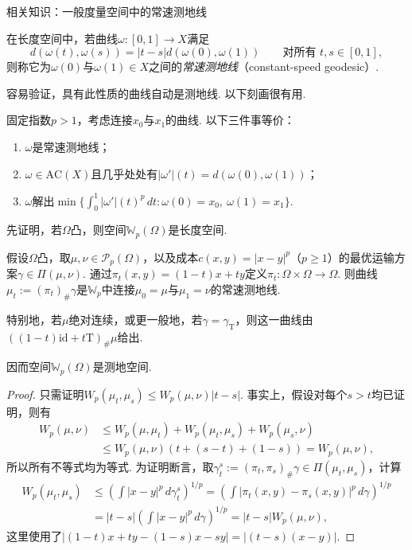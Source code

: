 \begin{sourcebox}{相关知识：一般度量空间中的常速测地线}
\begin{definition*}
在长度空间中，若曲线$\omega:[0,1]\to X$满足
\[
d(\omega(t),\omega(s))=|t-s|d(\omega(0),\omega(1))\qquad\text{对所有 }t,s\in[0,1],
\]
则称它为$\omega(0)$与$\omega(1)\in X$之间的\emph{常速测地线}（constant-speed geodesic）.
\end{definition*}
容易验证，具有此性质的曲线自动是测地线. 以下刻画很有用.
\begin{proposition*}
固定指数$p>1$，考虑连接$x_0$与$x_1$的曲线. 以下三件事等价：
\begin{enumerate}
\item $\omega$是常速测地线；
\item $\omega\in\mathrm{AC}(X)$且几乎处处有$|\omega'|(t)=d(\omega(0),\omega(1))$；
\item $\omega$解出$\min\{\int_0^1|\omega'|(t)^p\,dt:\omega(0)=x_0,\ \omega(1)=x_1\}$.
\end{enumerate}
\end{proposition*}
\end{sourcebox}

先证明，若$\Omega$凸，则空间$\mathbb W_p(\Omega)$是长度空间.

\begin{theorem}\label{obj:5.27}
假设$\Omega$凸，取$\mu,\nu\in\mathscr P_p(\Omega)$，以及成本$c(x,y)=|x-y|^p$（$p\ge1$）的最优运输方案$\gamma\in\Pi(\mu,\nu)$. 通过$\pi_t(x,y)=(1-t)x+ty$定义$\pi_t:\Omega\times\Omega\to\Omega$. 则曲线$\mu_t:=(\pi_t)_\#\gamma$是$\mathbb W_p$中连接$\mu_0=\mu$与$\mu_1=\nu$的常速测地线.

特别地，若$\mu$绝对连续，或更一般地，若$\gamma=\gamma_{\mathrm T}$，则这一曲线由$((1-t)\mathrm{id}+t\mathrm T)_\#\mu$给出.

因而空间$\mathbb W_p(\Omega)$是测地空间.
\end{theorem}
\begin{proof}
只需证明$W_p(\mu_t,\mu_s)\le W_p(\mu,\nu)|t-s|$. 事实上，假设对每个$s>t$均已证明，则有
\[
\begin{aligned}
W_p(\mu,\nu)&\le W_p(\mu,\mu_t)+W_p(\mu_t,\mu_s)+W_p(\mu_s,\nu)\\
&\le W_p(\mu,\nu)(t+(s-t)+(1-s))=W_p(\mu,\nu),
\end{aligned}
\]
所以所有不等式均为等式. 为证明断言，取$\gamma_t^s:=(\pi_t,\pi_s)_\#\gamma\in\Pi(\mu_t,\mu_s)$，计算
\[
\begin{aligned}
W_p(\mu_t,\mu_s)&\le\left(\int|x-y|^p\,d\gamma_t^s\right)^{1/p}
=\left(\int|\pi_t(x,y)-\pi_s(x,y)|^p\,d\gamma\right)^{1/p}\\
&=|t-s|\left(\int|x-y|^p\,d\gamma\right)^{1/p}=|t-s|W_p(\mu,\nu),
\end{aligned}
\]
这里使用了$|(1-t)x+ty-(1-s)x-sy|=|(t-s)(x-y)|$.
\end{proof}

